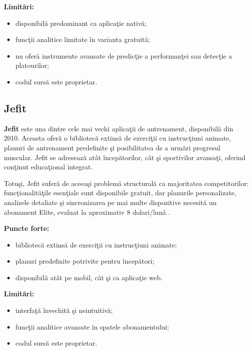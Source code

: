 \textbf{Limit\u ari:}
\begin{itemize}
  \item disponibil\u a predominant ca aplica\c tie nativ\u a;
  \item func\c tii analitice limitate \^ in varianta gratuit\u a;
  \item nu ofer\u a instrumente avansate de predic\c tie a performan\c tei
        sau detec\c tie a platourilor;
  \item codul surs\u a este proprietar.
\end{itemize}

\subsection{Jefit}

\textbf{Jefit} \cite{jefit2024} este una dintre cele mai vechi aplica\c tii
de antrenament, disponibil\u a din 2010. Aceasta ofer\u a o bibliotec\u a
extins\u a de exerci\c tii cu instruc\c tiuni animate, planuri de antrenament
predefinite \c si posibilitatea de a urm\u ari progresul muscular. Jefit
se adreseaz\u a at\^ at \^ incep\u atorilor, c\^ at \c si sportivilor avansa\c ti,
oferind con\c tinut educa\c tional integrat.

Totu\c si, Jefit sufer\u a de aceea\c si problem\u a structural\u a ca
majoritatea competitorilor: func\c tionalit\u a\c tile esen\c tiale sunt
disponibile gratuit, dar planurile personalizate, analizele detaliate
\c si sincronizarea pe mai multe dispozitive necesit\u a un abonament
Elite, evaluat la aproximativ 8 dolari/lun\u a \cite{jefit2024}.

\textbf{Puncte forte:}
\begin{itemize}
  \item bibliotec\u a extins\u a de exerci\c tii cu instruc\c tiuni animate;
  \item planuri predefinite potrivite pentru \^ incep\u atori;
  \item disponibil\u a at\^ at pe mobil, c\^ at \c si ca aplica\c tie web.
\end{itemize}

\textbf{Limit\u ari:}
\begin{itemize}
  \item interfa\c t\u a \^ invechit\u a \c si neintuitiv\u a;
  \item func\c tii analitice avansate \^ in spatele abonamentului;
  \item codul surs\u a este proprietar.
\end{itemize}

